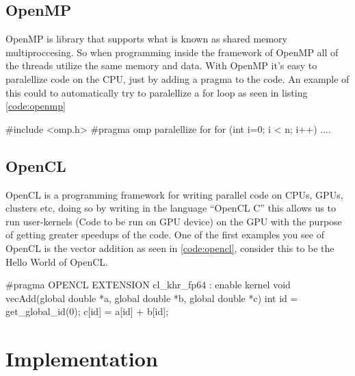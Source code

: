\documentclass[12pt]{report}
\begin{document}
\section{OpenMP}
\label{subsec:openmp}
OpenMP is  library that supports what is known as shared memory multiproccesing. So when programming inside the framework of OpenMP all of the threads utilize the same memory and data. With OpenMP it's easy to paralellize code on the CPU, just by adding a pragma to the code. An example of this could to automatically try to paralellize a for loop as seen in listing \ref{code:openmp}


\begin{c_lang}[caption={Example of how to automatically paralellize for loops with OpenMP}\label{code:openmp}]
  #include <omp.h>
  #pragma omp paralellize for
  for (int i=0; i < n; i++) {
    ....
  }
\end{c_lang}

\section{OpenCL}
\label{subsec:opencl}
OpenCL is a programming framework for writing parallel code on CPUs, GPUs, clusters etc, doing so by writing in the language ``OpenCL C'' this allows us to run user-kernels (Code to be run on GPU device) on the GPU with the purpose of getting greater speedups of the code. One of the first examples you see of OpenCL is the vector addition as seen in \ref{code:opencl}, consider this to be the Hello World of OpenCL.

\begin{c_lang}[caption={Example of adding to vectors in OpenCL}\label{code:opencl}]
  #pragma OPENCL EXTENSION cl_khr_fp64 : enable
  kernel void vecAdd(global double *a, global double *b,
                                       global double *c){
    int id = get_global_id(0);
    c[id] = a[id] + b[id];
  }
\end{c_lang}



\chapter{Implementation}
\label{subsec:implement}
\end{document}
